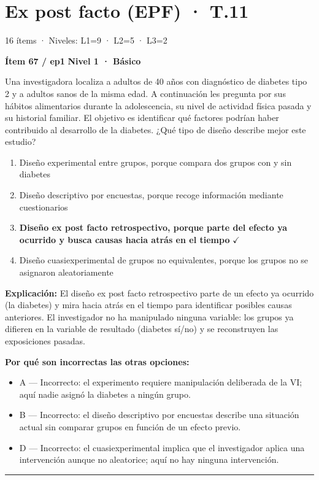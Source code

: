 \documentclass[12pt,a4paper]{article}
\begin{document}
\section{Ex post facto (EPF) · T.11}
{\small\color{gris} 16 ítems · Niveles: L1=9 · L2=5 · L3=2}

\begin{mdframed}[backgroundcolor=fondogris,linecolor=azul,linewidth=1pt,innerleftmargin=10pt,innerrightmargin=10pt,innertopmargin=7pt,innerbottommargin=7pt]
\textbf{Ítem 67 / ep1} \hfill {\small\bfseries\color{azul} Nivel 1 · Básico}
\end{mdframed}

Una investigadora localiza a adultos de 40 años con diagnóstico de diabetes tipo 2 y a adultos sanos de la misma edad. A continuación les pregunta por sus hábitos alimentarios durante la adolescencia, su nivel de actividad física pasada y su historial familiar. El objetivo es identificar qué factores podrían haber contribuido al desarrollo de la diabetes. ¿Qué tipo de diseño describe mejor este estudio?

\begin{enumerate}
  \item[A.] Diseño experimental entre grupos, porque compara dos grupos con y sin diabetes
  \item[B.] Diseño descriptivo por encuestas, porque recoge información mediante cuestionarios
  \item[\textbf{\color{verde}C.}] \textbf{\color{verde} Diseño ex post facto retrospectivo, porque parte del efecto ya ocurrido y busca causas hacia atrás en el tiempo} \hfill $\checkmark$
  \item[D.] Diseño cuasiexperimental de grupos no equivalentes, porque los grupos no se asignaron aleatoriamente
\end{enumerate}

\noindent\textbf{\color{azul}Explicación:} El diseño ex post facto retrospectivo parte de un efecto ya ocurrido (la diabetes) y mira hacia atrás en el tiempo para identificar posibles causas anteriores. El investigador no ha manipulado ninguna variable: los grupos ya difieren en la variable de resultado (diabetes sí/no) y se reconstruyen las exposiciones pasadas.

\noindent\textbf{\color{gris}Por qué son incorrectas las otras opciones:}
\begin{itemize}
  \item {\small A — Incorrecto: el experimento requiere manipulación deliberada de la VI; aquí nadie asignó la diabetes a ningún grupo.}
  \item {\small B — Incorrecto: el diseño descriptivo por encuestas describe una situación actual sin comparar grupos en función de un efecto previo.}
  \item {\small D — Incorrecto: el cuasiexperimental implica que el investigador aplica una intervención aunque no aleatorice; aquí no hay ninguna intervención.}
\end{itemize}
\vspace{8pt}\hrule\vspace{10pt}
\end{document}
